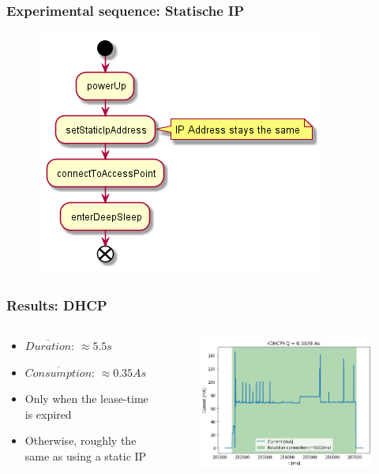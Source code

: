 \begin{frame}
    \frametitle{Experimental sequence: Statische IP}
    \begin{figure}
        \includegraphics[scale=0.6]{../paper/fig/sequence_static_ip.png}
    \end{figure}
\end{frame}

\begin{frame}
    \frametitle{Results: DHCP}
    \begin{columns}
        \begin{column}{0.35\textwidth}
            \begin{itemize}
                \item $\overline{Duration}$: $\approx5.5s$
                \item $\overline{Consumption}$: $\approx0.35As$
                \item Only when the lease-time is expired
                \item Otherwise, roughly the same as using a static IP
            \end{itemize}
        \end{column}
        \begin{column}{0.65\textwidth}
            \begin{figure}
                \includegraphics[scale=0.5]{../paper/fig/dhcp.png}
            \end{figure}
        \end{column}
    \end{columns}
\end{frame}

